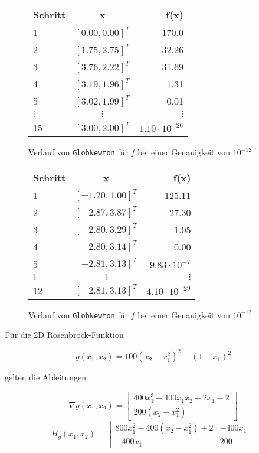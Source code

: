\documentclass[a4paper, 12pt]{report}
\begin{document}
\begin{figure}[H]
  \centering
  \def\arraystretch{1.25}
  \begin{tabular}{l|c|r}
    \hline
    \textbf{Schritt} & \textbf{x} & \textbf{f(x)}\\
    \hline
    1 & $[0.00, 0.00]^T$ & 170.0\\
    2 & $[1.75, 2.75]^T$ & 32.26\\
    3 & $[3.76, 2.22]^T$ & 31.69\\
    4 & $[3.19, 1.96]^T$ & 1.31\\
    5 & $[3.02, 1.99]^T$ & 0.01\\
    $\vdots$ & $\vdots$ & $\vdots$\\
    15 & $[3.00, 2.00]^T$ & $1.10 \cdot 10^{-26}$\\
    \hline
  \end{tabular}
  \caption{Verlauf von \lstinline[basicstyle=\ttfamily\color{black}]|GlobNewton| für $f$ bei einer Genauigkeit von $10^{-12}$}
  \label{convHimmel1}
\end{figure}

\begin{figure}[H]
  \centering
  \def\arraystretch{1.25}
  \begin{tabular}{l|c|r}
    \hline
    \textbf{Schritt} & \textbf{x} & \textbf{f(x)}\\
    \hline
    1 & $[-1.20, 1.00]^T$ & 125.11\\
    2 & $[-2.87, 3.87]^T$ & 27.30\\
    3 & $[-2.80, 3.29]^T$ & 1.05\\
    4 & $[-2.80, 3.14]^T$ & 0.00\\
    5 & $[-2.81, 3.13]^T$ & $9.83 \cdot 10^{-7}$\\
    $\vdots$ & $\vdots$ & $\vdots$\\
    12 & $[-2.81, 3.13]^T$ & $4.10 \cdot 10^{-29}$\\
    \hline
  \end{tabular}
  \caption{Verlauf von \lstinline[basicstyle=\ttfamily\color{black}]|GlobNewton| für $f$ bei einer Genauigkeit von $10^{-12}$}
  \label{convHimmel2}
\end{figure}

Für die 2D Rosenbrock-Funktion

$$ g(x_1, x_2) = 100(x_2 - x_1^2)^2 + (1 - x_1)^2 $$

gelten die Ableitungen

$$ \nabla g(x_1, x_2) = \begin{bmatrix} 400x_1^3 - 400x_1x_2 + 2x_1 - 2\\200(x_2 - x_1^2)\end{bmatrix} $$
$$ H_g(x_1, x_2) = \begin{bmatrix} 800x_1^2 - 400(x_2-x_1^2) + 2 & -400x_1\\-400x_1 & 200 \end{bmatrix} $$
\end{document}
